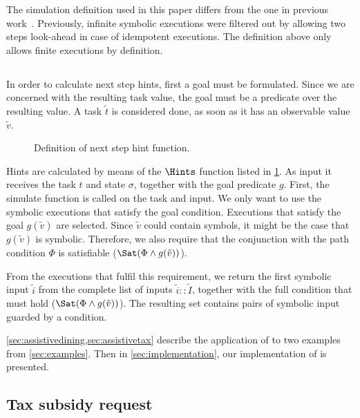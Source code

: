 The simulation definition used in this paper differs from the one in previous work~\cite{Naus2019}.
Previously, infinite symbolic executions were filtered out by allowing two steps look-ahead in case of idempotent executions.
The definition above only allows finite executions by definition.




\subsection{}


In order to calculate next step hints, first a goal must be formulated.
Since we are concerned with the resulting task value, the goal must be a predicate over the resulting value.
A task $\tilde{t}$ is considered done, as soon as it has an observable value $\tilde{v}$.

\begin{figure}
  \caption{Definition of next step hint function.}
  \label{fig:hints}
\end{figure}


Hints are calculated by means of the $\Hints$ function listed in \cref{fig:hints}.
As input it receives the task $t$ and state $\sigma$, together with the goal predicate $g$.
First, the simulate function is called on the task and input.
We only want to use the symbolic executions that satisfy the goal condition.
Executions that satisfy the goal $g(\tilde{v})$ are selected.
Since $\tilde{v}$ could contain symbols, it might be the case that $g(\tilde{v})$ is symbolic.
Therefore, we also require that the conjunction with the path condition $\Phi$ is satisfiable ($\Sat(\Phi\land g(\tilde{v}))$).

From the executions that fulfil this requirement, we return the first symbolic input $\tilde{i}$ from the complete list of inputs $\tilde{i}::\tilde{I}$,
together with the full condition that must hold ($\Sat(\Phi\land g(\tilde{v}))$).
The resulting set contains pairs of symbolic input guarded by a condition.

\cref{sec:assistivedining,sec:assistivetax} describe the application of \ASTOPHAT to two examples from \cref{sec:examples}.
Then in \cref{sec:implementation}, our implementation of \ASTOPHAT is presented.


\subsection{Tax subsidy request}
\label{sec:assistivetax}

